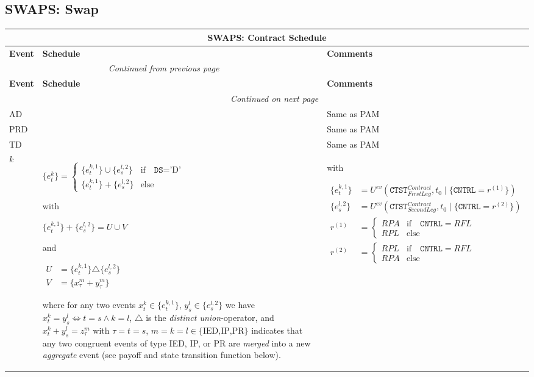\documentclass[9pt,oneside]{amsart}
\newenvironment{schedule}[1]{
	\hfill %
	\begin{longtable}{| p{0.05\textwidth} | p{0.5\textwidth} |  p{0.4\textwidth} |}
	\multicolumn{3}{c}{\textbf{#1: Contract Schedule}}\\
	\hline
	\textbf{Event} & \textbf{Schedule} & \textbf{Comments} \\
	\hline
	\endfirsthead
	\multicolumn{2}{c}{\textit{Continued from previous page}} \\
	\hline
	\textbf{Event} & \textbf{Schedule} & \textbf{Comments} \\
	\hline
	\endhead
	\hline \multicolumn{2}{r}{\textit{Continued on next page}} \\
	\endfoot
	\endlastfoot
}{%
	\hline
	\end{longtable}
}
\newcommand{\attr}[1]{\texttt{#1}}
\newcommand{\cldev}[3]{U^{ev}(#1,#2 \mid\{#3\})}
\begin{document}

\subsection{SWAPS: Swap}\label{sec:swaps}


\begin{schedule}{SWAPS}
	AD & & Same as PAM \\
	\hline
	PRD & & Same as PAM \\
	\hline
	TD & & Same as PAM \\
	\hline
	$k$ & $\{e_t^k\} = \begin{cases}
				\{e_t^{k,1}\}\cup \{e_s^{l,2}\} & \text{if}\quad \attr{DS}=\text{'D'} \\
				\{e_t^{k,1}\} + \{e_s^{l,2}\} & \text{else} \end{cases}$ \par
	with\par
	$\{e_t^{k,1}\}+\{e_s^{l,2}\} = U \cup V$\par
	and\par
	{$\begin{aligned}
		U &= \{e_t^{k,1}\} \triangle \{e_s^{l,2}\}\\
		V &= \{x_\tau^m+y_\tau^m\}
	\end{aligned}$} \par
	where for any two events $x_t^k\in\{e_t^{k,1}\}$, $y_s^l\in\{e_s^{l,2}\}$ we have $x_t^k=y_s^l \iff t=s \land k=l$, $\triangle$ is the \textit{distinct union}-operator, and $x_t^k+y_s^l=z_\tau^m$ with $\tau=t=s$, $m=k=l\in\{\text{IED,IP,PR}\}$ indicates that any two congruent events of type IED, IP, or PR are \textit{merged} into a new \textit{aggregate} event (see payoff and state transition function below).
		& with\par
			{$\begin{aligned}
				\{e_t^{k,1}\} &= \cldev{\attr{CTST}_{FirstLeg}^{Contract}}{t_0}{\attr{CNTRL}=r^{(1)}} \\
				\{e_s^{l,2}\} &= \cldev{\attr{CTST}_{SecondLeg}^{Contract}}{t_0}{\attr{CNTRL}=r^{(2)}} \\
				r^{(1)} &= \begin{cases} RPA & \text{if}\quad \attr{CNTRL}=RFL \\
					RPL & \text{else} \end{cases} \\
				r^{(2)} &= \begin{cases} RPL & \text{if}\quad \attr{CNTRL}=RFL \\
					RPA & \text{else} \end{cases}
			\end{aligned}$} \\
\end{schedule}
\end{document}
